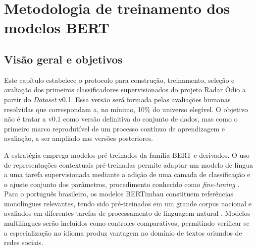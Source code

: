% 
%
%

\chapter{Metodologia de treinamento dos modelos BERT}
\label{cap:metodologia-bert-v01}

\section{Visão geral e objetivos}
\label{sec:visao-geral-bert}

Este capítulo estabelece o protocolo para construção, treinamento, seleção e
avaliação dos primeiros classificadores supervisionados do projeto Radar Ódio
a partir do \textit{Dataset} v0.1. Essa versão será formada pelas avaliações
humanas resolvidas que correspondam a, no mínimo, 10\% do universo elegível. O
objetivo não é tratar a v0.1 como versão definitiva do conjunto de dados, mas
como o primeiro marco reprodutível de um processo contínuo de aprendizagem e
avaliação, a ser ampliado nas versões posteriores.

A estratégia emprega modelos pré-treinados da família BERT e derivados. O uso
de representações contextuais pré-treinadas permite adaptar um modelo de língua
a uma tarefa supervisionada mediante a adição de uma camada de classificação e
o ajuste conjunto dos parâmetros, procedimento conhecido como \textit{fine-tuning}
\cite{devlin2019bert}. Para o português brasileiro, os modelos BERTimbau
constituem referências monolíngues relevantes, tendo sido pré-treinados em um
grande corpus nacional e avaliados em diferentes tarefas de processamento de
linguagem natural \cite{souza2020bertimbau}. Modelos multilíngues serão incluídos
como controles comparativos, permitindo verificar se a especialização no idioma
produz vantagem no domínio de textos oriundos de redes sociais.

